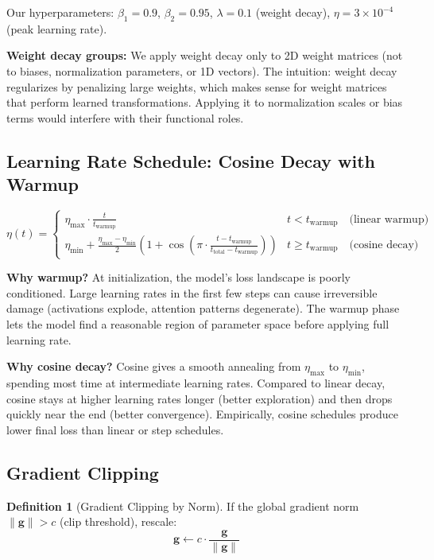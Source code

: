 \documentclass[11pt, a4paper]{article}
\theoremstyle{definition}
\newtheorem{definition}{Definition}[section]
\begin{document}
Our hyperparameters: $\beta_1 = 0.9$, $\beta_2 = 0.95$, $\lambda = 0.1$ (weight decay), $\eta = 3 \times 10^{-4}$ (peak learning rate).

\textbf{Weight decay groups:} We apply weight decay only to 2D weight matrices (not to biases, normalization parameters, or 1D vectors). The intuition: weight decay regularizes by penalizing large weights, which makes sense for weight matrices that perform learned transformations. Applying it to normalization scales or bias terms would interfere with their functional roles.

\subsection{Learning Rate Schedule: Cosine Decay with Warmup}

\begin{equation}\label{eq:cosine_schedule}
    \eta(t) = \begin{cases}
        \eta_{\max} \cdot \frac{t}{t_{\text{warmup}}} & t < t_{\text{warmup}} \quad \text{(linear warmup)} \\[0.5em]
        \eta_{\min} + \frac{\eta_{\max} - \eta_{\min}}{2}\left(1 + \cos\left(\pi \cdot \frac{t - t_{\text{warmup}}}{t_{\text{total}} - t_{\text{warmup}}}\right)\right) & t \geq t_{\text{warmup}} \quad \text{(cosine decay)}
    \end{cases}
\end{equation}

\textbf{Why warmup?} At initialization, the model's loss landscape is poorly conditioned. Large learning rates in the first few steps can cause irreversible damage (activations explode, attention patterns degenerate). The warmup phase lets the model find a reasonable region of parameter space before applying full learning rate.

\textbf{Why cosine decay?} Cosine gives a smooth annealing from $\eta_{\max}$ to $\eta_{\min}$, spending most time at intermediate learning rates. Compared to linear decay, cosine stays at higher learning rates longer (better exploration) and then drops quickly near the end (better convergence). Empirically, cosine schedules produce lower final loss than linear or step schedules.

\subsection{Gradient Clipping}

\begin{definition}[Gradient Clipping by Norm]
If the global gradient norm $\|\bm{g}\| > c$ (clip threshold), rescale:
\begin{equation}
    \bm{g} \leftarrow c \cdot \frac{\bm{g}}{\|\bm{g}\|}
\end{equation}
\end{definition}
\end{document}
